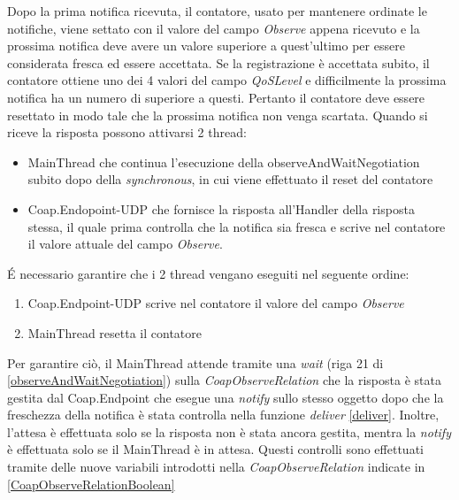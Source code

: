 				Dopo la prima notifica ricevuta, il contatore, usato per mantenere ordinate le notifiche, viene settato con il valore del campo \textit{Observe} appena ricevuto e la prossima notifica deve avere un valore superiore a quest'ultimo per essere considerata fresca ed essere accettata. Se la registrazione è accettata subito, il contatore ottiene uno dei 4 valori del campo \textit{QoSLevel} e difficilmente la prossima notifica ha un numero di superiore a questi. Pertanto il contatore deve essere resettato in modo tale che la prossima notifica non venga scartata.
				Quando si riceve la risposta possono attivarsi 2 thread:
				\begin{itemize}
					\item MainThread che continua l'esecuzione della observeAndWaitNegotiation subito dopo della \textit{synchronous}, in cui viene effettuato il reset del contatore
					\item Coap.Endopoint-UDP che fornisce la risposta all'Handler della risposta stessa, il quale prima controlla che la notifica sia fresca e scrive nel contatore il valore attuale del campo \textit{Observe}.
				\end{itemize}
				\'E necessario garantire che i 2 thread vengano eseguiti nel seguente ordine:
				\begin{enumerate}
					\item Coap.Endpoint-UDP scrive nel contatore il valore del campo \textit{Observe}
					\item MainThread resetta il contatore
				\end{enumerate}
				Per garantire ciò, il MainThread attende tramite una \textit{wait} (riga 21 di \ref{observeAndWaitNegotiation}) sulla \textit{CoapObserveRelation} che la risposta è stata gestita dal Coap.Endpoint che esegue una \textit{notify} sullo stesso oggetto dopo che la freschezza della notifica è stata controlla nella funzione \textit{deliver} \ref{deliver}. Inoltre, l'attesa è effettuata solo se la risposta non è stata ancora gestita, mentra la \textit{notify} è effettuata solo se il MainThread è in attesa. Questi controlli sono effettuati tramite delle nuove variabili introdotti nella \textit{CoapObserveRelation} indicate in \ref{CoapObserveRelationBoolean}
				


